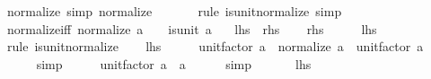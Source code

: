 \begin{isabellebody}
\ normalize{\isacharunderscore}{\kern0pt}{}\ {\isacharbrackleft}{\kern0pt}simp{\isacharbrackright}{\kern0pt}{\isacharcolon}{\kern0pt}\ {\isachardoublequoteopen}normalize\ {}\ {\isacharequal}{\kern0pt}\ {}{\isachardoublequoteclose}\isanewline
%
\isadelimproof
\ \ %
\endisadelimproof
%
\isatagproof
{}\isamarkupfalse%
\ {\isacharparenleft}{\kern0pt}rule\ is{\isacharunderscore}{\kern0pt}unit{\isacharunderscore}{\kern0pt}normalize{\isacharparenright}{\kern0pt}\ simp%
\endisatagproof
{\isafoldproof}%
%
\isadelimproof
\isanewline
%
\endisadelimproof
\isanewline
{}\isamarkupfalse%
\ normalize{\isacharunderscore}{\kern0pt}{}{\isacharunderscore}{\kern0pt}iff{\isacharcolon}{\kern0pt}\ {\isachardoublequoteopen}normalize\ a\ {\isacharequal}{\kern0pt}\ {}\ {\isasymlongleftrightarrow}\ is{\isacharunderscore}{\kern0pt}unit\ a{\isachardoublequoteclose}\isanewline
\ \ {\isacharparenleft}{\kern0pt}\ {\isachardoublequoteopen}{\isacharquery}{\kern0pt}lhs\ {\isasymlongleftrightarrow}\ {\isacharquery}{\kern0pt}rhs{\isachardoublequoteclose}{\isacharparenright}{\kern0pt}\isanewline
%
\isadelimproof
%
\endisadelimproof
%
\isatagproof
{}\isamarkupfalse%
\isanewline
\ \ \isamarkupfalse%
\ {\isacharquery}{\kern0pt}rhs\isanewline
\ \ \isamarkupfalse%
\ \isamarkupfalse%
\ {\isacharquery}{\kern0pt}lhs\ \isamarkupfalse%
\ {\isacharparenleft}{\kern0pt}rule\ is{\isacharunderscore}{\kern0pt}unit{\isacharunderscore}{\kern0pt}normalize{\isacharparenright}{\kern0pt}\isanewline
{}\isamarkupfalse%
\isanewline
\ \ \isamarkupfalse%
\ {\isacharquery}{\kern0pt}lhs\isanewline
\ \ \isamarkupfalse%
\ \isamarkupfalse%
\ {\isachardoublequoteopen}unit{\isacharunderscore}{\kern0pt}factor\ a\ {\isacharasterisk}{\kern0pt}\ normalize\ a\ {\isacharequal}{\kern0pt}\ unit{\isacharunderscore}{\kern0pt}factor\ a\ {\isacharasterisk}{\kern0pt}\ {}{\isachardoublequoteclose}\isanewline
\ \ \ \ \isamarkupfalse%
\ simp\isanewline
\ \ \isamarkupfalse%
\ \isamarkupfalse%
\ {\isachardoublequoteopen}unit{\isacharunderscore}{\kern0pt}factor\ a\ {\isacharequal}{\kern0pt}\ a{\isachardoublequoteclose}\isanewline
\ \ \ \ \isamarkupfalse%
\ simp\isanewline
\ \ \isamarkupfalse%
\isanewline
\ \ \isamarkupfalse%
\ {\isacartoucheopen}{\isacharquery}{\kern0pt}lhs{\isacartoucheclose}\ \isamarkupfalse%

\end{isabellebody}
